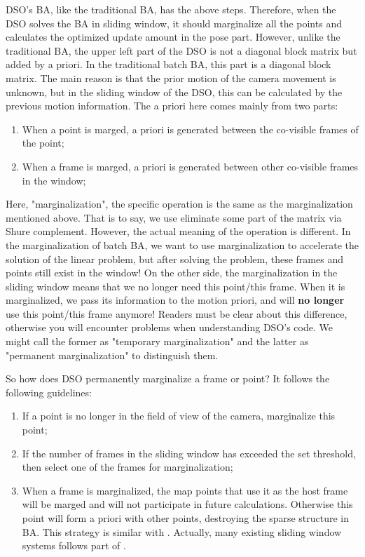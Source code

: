 \documentclass[a4paper,10pt]{article}
\begin{document}
	DSO's BA, like the traditional BA, has the above steps. Therefore, when the DSO solves the BA in sliding window, it should marginalize all the points and calculates the optimized update amount in the pose part. However, unlike the traditional BA, the upper left part of the DSO is not a diagonal block matrix but added by a priori. In the traditional batch BA, this part is a diagonal block matrix. The main reason is that the prior motion of the camera movement is unknown, but in the sliding window of the DSO, this can be calculated by the previous motion information. The a priori here comes mainly from two parts:
	\begin{enumerate}
	\item When a point is marged, a priori is generated between the co-visible frames of the point;
	\item When a frame is marged, a priori is generated between other co-visible frames in the window;
	\end{enumerate}
	
	Here, "marginalization", the specific operation is the same as the marginalization mentioned above. That is to say, we use eliminate some part of the matrix via Shure complement. However, the actual meaning of the operation is different. In the marginalization of batch BA, we want to use marginalization to accelerate the solution of the linear problem, but after solving the problem, these frames and points still exist in the window! On the other side, the marginalization in the sliding window means that we no longer need this point/this frame. When it is marginalized, we pass its information to the motion priori, and will \textbf{no longer} use this point/this frame anymore! Readers must be clear about this difference, otherwise you will encounter problems when understanding DSO's code. We might call the former as "temporary marginalization" and the latter as "permanent marginalization" to distinguish them.
	
	So how does DSO permanently marginalize a frame or point? It follows the following guidelines:
	\begin{enumerate}
	\item If a point is no longer in the field of view of the camera, marginalize this point;
	\item If the number of frames in the sliding window has exceeded the set threshold, then select one of the frames for marginalization;
	\item When a frame is marginalized, the map points that use it as the host frame will be marged and will not participate in future calculations. Otherwise this point will form a priori with other points, destroying the sparse structure in BA. This strategy is similar with \cite{leutenegger2015keyframe}. Actually, many existing sliding window systems follows part of \cite{leutenegger2015keyframe}.
	\end{enumerate}
	
\end{document}
